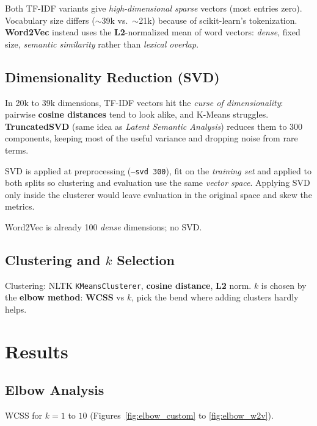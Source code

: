 \documentclass[twocolumn]{article}
\begin{document}
Both TF-IDF variants give \textit{high-dimensional sparse} vectors (most entries zero). Vocabulary size differs ($\sim$39k vs.\ $\sim$21k) because of scikit-learn's tokenization. \textbf{Word2Vec} instead uses the \textbf{L2}-normalized mean of word vectors: \textit{dense}, fixed size, \textit{semantic similarity} rather than \textit{lexical overlap}.

\subsection{Dimensionality Reduction (SVD)}

In 20k to 39k dimensions, TF-IDF vectors hit the \textit{curse of dimensionality}: pairwise \textbf{cosine distances} tend to look alike, and K-Means struggles. \textbf{TruncatedSVD} (same idea as \textit{Latent Semantic Analysis}) reduces them to 300 components, keeping most of the useful variance and dropping noise from rare terms.

SVD is applied at preprocessing (\texttt{--svd 300}), fit on the \textit{training set} and applied to both splits so clustering and evaluation use the same \textit{vector space}. Applying SVD only inside the clusterer would leave evaluation in the original space and skew the metrics.

Word2Vec is already 100 \textit{dense} dimensions; no SVD.

\subsection{Clustering and $k$ Selection}

Clustering: NLTK \texttt{KMeansClusterer}, \textbf{cosine distance}, \textbf{L2} norm. $k$ is chosen by the \textbf{elbow method}: \textbf{WCSS} vs $k$, pick the bend where adding clusters hardly helps.

\section{Results}

\subsection{Elbow Analysis}

WCSS for $k = 1$ to $10$ (Figures~\ref{fig:elbow_custom} to \ref{fig:elbow_w2v}).
\end{document}
